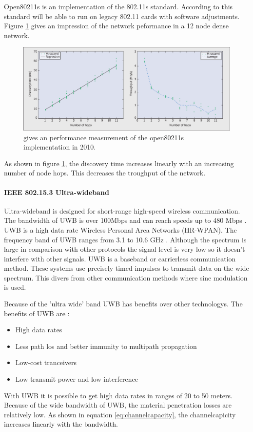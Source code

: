 \documentclass[10pt,a4paper]{article}
\begin{document}
Open80211s is an implementation of the 802.11s standard. According to \cite{ieee80211sthewlanmeshstandard} this standard will be able to run on legacy 802.11 cards with software adjustments. Figure \ref{fig:open80211s} gives an impression of the network peformance in a 12 node dense network. 
\begin{figure}[H]
   \centering
   \includegraphics[width=1\textwidth]{open80211s}
   \caption{\cite{ieee80211sthewlanmeshstandard} gives an performance measurement of the open80211s implementation in 2010.}
   \label{fig:open80211s}
\end{figure}
As shown in figure \ref{fig:open80211s}, the discovery time increases linearly with an increasing number of node hops. This decreases the troughput of the network.


\paragraph{IEEE 802.15.3 Ultra-wideband}
Ultra-wideband is designed for short-range high-speed wireless communication. The bandwidth of UWB is over 100Mbps and can reach speeds up to 480 Mbps \cite{comparitivestudywirelessprotocols}. UWB is a high data rate Wireless Personal Area Networks (HR-WPAN). The frequency band of UWB ranges from 3.1 to 10.6 GHz \cite{ultrawidebandwirelesscommunications}. Although the spectrum is large in comparison with other protocols the signal level is very low so it doesn't interfere with other signals. UWB is a baseband or carrierless communication method. These systems use precisely timed impulses to transmit data on the wide spectrum. This divers from other communication methods where sine modulation is used. \cite{Bluetoothwifisurveyandcomparison}

Because of the 'ultra wide' band UWB has benefits over other technologys. The benefits of UWB are \cite{ultrawidebandwirelesscommunications}\cite{combook}: 
\begin{itemize}
\setlength\itemsep{0em}
    \item High data rates
    \item Less path los and better immunity to multipath propagation
    \item Low-cost tranceivers
    \item Low transmit power and low interference
\end{itemize}
 With UWB it is possible to get high data rates in ranges of 20 to 50 meters. Because of the wide bandwidth of UWB, the material penetration losses are relatively low. As shown in equation \ref{eq:channelcapacity}, the channelcapicity increases linearly with the bandwidth.
\end{document}
